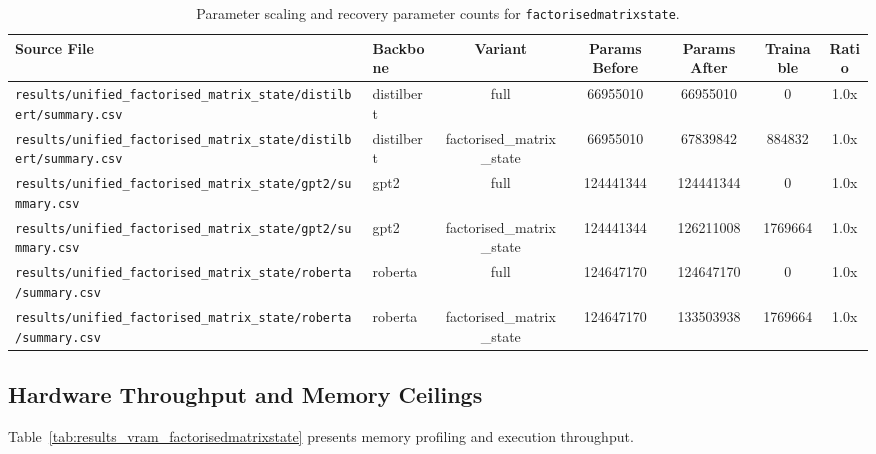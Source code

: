 \begin{table}[t]
\centering
\small
\begin{tabular}{llccccc}
\toprule
\textbf{Source File} & \textbf{Backbone} & \textbf{Variant} & \textbf{Params Before} & \textbf{Params After} & \textbf{Trainable} & \textbf{Ratio} \\
\midrule
\texttt{results/unified\_factorised\_matrix\_state/distilbert/summary.csv} & distilbert & full & 66955010 & 66955010 & 0 & 1.0x \\
\texttt{results/unified\_factorised\_matrix\_state/distilbert/summary.csv} & distilbert & factorised\_matrix\_state & 66955010 & 67839842 & 884832 & 1.0x \\
\texttt{results/unified\_factorised\_matrix\_state/gpt2/summary.csv} & gpt2 & full & 124441344 & 124441344 & 0 & 1.0x \\
\texttt{results/unified\_factorised\_matrix\_state/gpt2/summary.csv} & gpt2 & factorised\_matrix\_state & 124441344 & 126211008 & 1769664 & 1.0x \\
\texttt{results/unified\_factorised\_matrix\_state/roberta/summary.csv} & roberta & full & 124647170 & 124647170 & 0 & 1.0x \\
\texttt{results/unified\_factorised\_matrix\_state/roberta/summary.csv} & roberta & factorised\_matrix\_state & 124647170 & 133503938 & 1769664 & 1.0x \\
\bottomrule
\end{tabular}
\caption{Parameter scaling and recovery parameter counts for \texttt{factorisedmatrixstate}.}
\label{tab:results_params_factorisedmatrixstate}
\end{table}

\subsection{Hardware Throughput and Memory Ceilings}
Table~\ref{tab:results_vram_factorisedmatrixstate} presents memory profiling and execution throughput.

